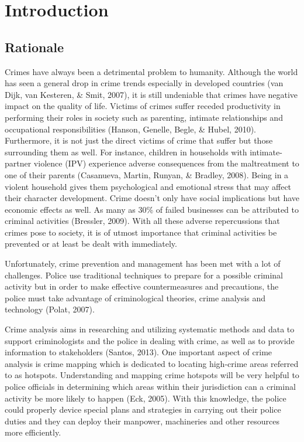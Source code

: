 
\chapter{Introduction}  %

\section{Rationale} %

    Crimes have always been a detrimental problem to humanity. Although the world has seen a general drop in crime trends especially in developed countries (van Dijk, van Kesteren, \& Smit, 2007), it is still undeniable that crimes have negative impact on the quality of life. Victims of crimes suffer receded productivity in performing their roles in society such as parenting, intimate relationships and occupational responsibilities (Hanson, Genelle, Begle, \& Hubel, 2010). Furthermore, it is not just the direct victims of crime that suffer but those surrounding them as well. For instance, children in households with intimate-partner violence (IPV) experience adverse consequences from the maltreatment to one of their parents (Casanueva, Martin, Runyan, \& Bradley, 2008). Being in a violent household gives them psychological and emotional stress that may affect their character development. Crime doesn’t only have social implications but have economic effects as well. As many as 30\% of failed businesses can be attributed to criminal activities (Bressler, 2009). With all these adverse repercussions that crimes pose to society, it is of utmost importance that criminal activities be prevented or at least be dealt with immediately. 

    Unfortunately, crime prevention and management has been met with a lot of challenges. Police use traditional techniques to prepare for a possible criminal activity but in order to make effective countermeasures and precautions, the police must take advantage of criminological theories, crime analysis and technology (Polat, 2007).

    Crime analysis aims in researching and utilizing systematic methods and data to support criminologists and the police in dealing with crime, as well as to provide information to stakeholders (Santos, 2013). One important aspect of crime analysis is crime mapping which is dedicated to locating high-crime areas referred to as hotspots. Understanding and mapping crime hotspots will be very helpful to police officials in determining which areas within their jurisdiction can a criminal activity be more likely to happen (Eck, 2005). With this knowledge, the police could properly device special plans and strategies in carrying out their police duties and they can deploy their manpower, machineries and other resources more efficiently.

